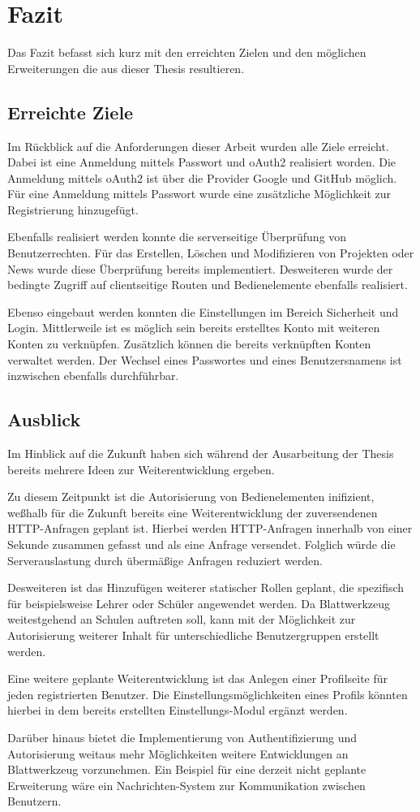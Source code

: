 \section{Fazit}
\label{sec:conclusion}
Das Fazit befasst sich kurz mit den erreichten Zielen und den möglichen Erweiterungen die aus dieser Thesis resultieren. 

\subsection{Erreichte Ziele}
Im Rückblick auf die Anforderungen dieser Arbeit wurden alle Ziele erreicht. Dabei ist eine Anmeldung mittels Passwort und \gls{oAuth2} realisiert worden. Die Anmeldung mittels \gls{oAuth2} ist über die Provider Google und GitHub möglich. Für eine Anmeldung mittels Passwort wurde eine zusätzliche Möglichkeit zur Registrierung hinzugefügt.

Ebenfalls realisiert werden konnte die serverseitige Überprüfung von Benutzerrechten. Für das Erstellen, Löschen und Modifizieren von Projekten oder News wurde diese Überprüfung bereits implementiert. Desweiteren wurde der bedingte Zugriff auf clientseitige Routen und Bedienelemente ebenfalls realisiert.

Ebenso eingebaut werden konnten die Einstellungen im Bereich Sicherheit und Login. Mittlerweile ist es möglich sein bereits erstelltes Konto mit weiteren Konten zu verknüpfen. Zusätzlich können die bereits verknüpften Konten verwaltet werden. Der Wechsel eines Passwortes und eines Benutzersnamens ist inzwischen ebenfalls durchführbar.

\subsection{Ausblick}
Im Hinblick auf die Zukunft haben sich während der Ausarbeitung der Thesis bereits mehrere Ideen zur Weiterentwicklung ergeben. 

Zu diesem Zeitpunkt ist die Autorisierung von Bedienelementen inifizient, weßhalb für die Zukunft bereits eine Weiterentwicklung der zuversendenen \gls{HTTP}-Anfragen geplant ist. Hierbei werden \gls{HTTP}-Anfragen innerhalb von einer Sekunde zusammen gefasst und als eine Anfrage versendet. Folglich würde die Serverauslastung durch übermäßige Anfragen reduziert werden.

Desweiteren ist das Hinzufügen weiterer statischer Rollen geplant, die spezifisch für beispielsweise Lehrer oder Schüler angewendet werden. Da Blattwerkzeug weitestgehend an Schulen auftreten soll, kann mit der Möglichkeit zur Autorisierung weiterer Inhalt für unterschiedliche Benutzergruppen erstellt werden.

Eine weitere geplante Weiterentwicklung ist das Anlegen einer Profilseite für jeden registrierten Benutzer. Die Einstellungsmöglichkeiten eines Profils könnten hierbei in dem bereits erstellten Einstellungs-Modul ergänzt werden. 

Darüber hinaus bietet die Implementierung von Authentifizierung und Autorisierung weitaus mehr Möglichkeiten weitere Entwicklungen an Blattwerkzeug vorzunehmen. Ein Beispiel für eine derzeit nicht geplante Erweiterung wäre ein Nachrichten-System zur Kommunikation zwischen Benutzern.


